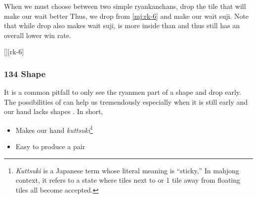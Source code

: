 \documentclass[12pt]{article}
\begin{document}
When we must choose between two simple ryankanchans, drop the tile that will make our wait better \citep[][p.~26]{feng-intermediate} Thus, we drop  from \ref{mj:rk-6} and make our wait suji. Note that while  drop also makes  wait suji,  is more inside than  and thus still has an overall lower win rate.

[][rk-6]

%
%
%

\subsubsection{134 Shape}

It is a common pitfall to only see the ryanmen part of a  shape and drop  early. The possibilities of  can help us tremendously especially when it is still early and our hand lacks shapes \citep{yoteru-134}. In short,

\begin{itemize}
\item Makes our hand \textit{kuttsuki}\footnote{\textit{Kuttsuki} is a Japanese term whose literal meaning is ``sticky,'' In mahjong context, it refers to a state where tiles next to or 1 tile away from floating tiles all become accepted.}
\item Easy to produce a pair
\end{itemize}
\end{document}
